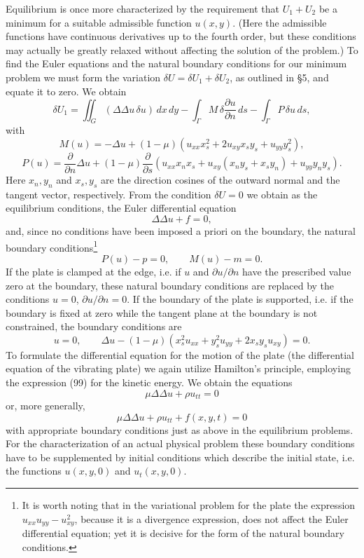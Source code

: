 Equilibrium is once more characterized by the requirement that $U_1+U_2$ be a minimum for a suitable admissible function $u(x,y)$. (Here the admissible functions have continuous derivatives up to the fourth order, but these conditions may actually be greatly relaxed without affecting the solution of the problem.) To find the Euler equations and the natural boundary conditions for our minimum problem we must form the variation $\delta U=\delta U_1+\delta U_2$, as outlined in \S5, and equate it to zero. We obtain
\[
\delta U_1=\iint_G(\Delta\Delta u\,\delta u)\,dx\,dy-\int_\Gamma M\,\delta\frac{\partial u}{\partial n}\,ds-\int_\Gamma P\,\delta u\,ds,
\]
with
\[
M(u)=-\Delta u+(1-\mu)(u_{xx}x_s^2+2u_{xy}x_sy_s+u_{yy}y_s^2),
\]
\[
P(u)=\frac{\partial}{\partial n}\Delta u+(1-\mu)\frac{\partial}{\partial s}\left(u_{xx}x_nx_s+u_{xy}(x_ny_s+x_sy_n)+u_{yy}y_ny_s\right).
\]
Here $x_n,y_n$ and $x_s,y_s$ are the direction cosines of the outward normal and the tangent vector, respectively. From the condition $\delta U=0$ we obtain as the equilibrium conditions, the Euler differential equation
\[
\Delta\Delta u+f=0,
\]
and, since no conditions have been imposed a priori on the boundary, the natural boundary conditions\footnote{It is worth noting that in the variational problem for the plate the expression $u_{xx}u_{yy}-u_{xy}^2$, because it is a divergence expression, does not affect the Euler differential equation; yet it is decisive for the form of the natural boundary conditions.}
\[
P(u)-p=0,\qquad M(u)-m=0.
\]
If the plate is clamped at the edge, i.e. if $u$ and $\partial u/\partial n$ have the prescribed value zero at the boundary, these natural boundary conditions are replaced by the conditions $u=0$, $\partial u/\partial n=0$. If the boundary of the plate is supported, i.e. if the boundary is fixed at zero while the tangent plane at the boundary is not constrained, the boundary conditions are
\begin{equation}\tag{102}
u=0,\qquad \Delta u-(1-\mu)(x_s^2u_{xx}+y_s^2u_{yy}+2x_sy_su_{xy})=0.
\end{equation}
To formulate the differential equation for the motion of the plate (the differential equation of the vibrating plate) we again utilize Hamilton's principle, employing the expression (99) for the kinetic energy. We obtain the equations
\[
\mu\Delta\Delta u+\rho u_{tt}=0
\]
or, more generally,
\[
\mu\Delta\Delta u+\rho u_{tt}+f(x,y,t)=0
\]
with appropriate boundary conditions just as above in the equilibrium problems. For the characterization of an actual physical problem these boundary conditions have to be supplemented by initial conditions which describe the initial state, i.e. the functions $u(x,y,0)$ and $u_t(x,y,0)$.

